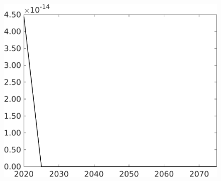 \documentclass[12pt]{article}
\begin{document}
\begin{figure}[h!!]
\begin{minipage}[]{0.32\textwidth}
	\end{minipage}	
	\begin{minipage}[]{0.32\textwidth}
		\includegraphics[width=1\textwidth]{../../codding_model/own_basedOnFried/optimalPol_010922_revision/figures/all_13Sept22/CompTaufPER_bytaul_Reg0_F_spillover0_nsk1_xgr0_knspil0_sep1_LFlimit1_emsbase0_countec0_GovRev0_etaa0.79_lgd0.png}
	\end{minipage}	
\end{figure}


\clearpage \newpage
\end{document}
